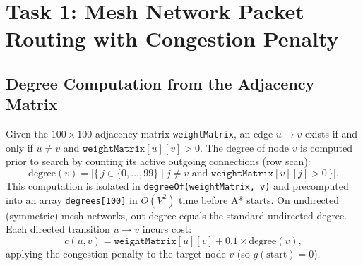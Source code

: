 \documentclass[11pt,a4paper]{article}
\begin{document}
\section{Task 1: Mesh Network Packet Routing with Congestion Penalty}

\subsection{Degree Computation from the Adjacency Matrix}
Given the $100 \times 100$ adjacency matrix \texttt{weightMatrix}, an edge $u \to v$ exists if and only if $u \neq v$ and $\texttt{weightMatrix}[u][v] > 0$. The degree of node $v$ is computed prior to search by counting its active outgoing connections (row scan):
\[
    \text{degree}(v) = \bigl|\{\, j \in \{0,\dots,99\} \mid j \neq v \text{ and } \texttt{weightMatrix}[v][j] > 0 \,\}\bigr|.
\]
This computation is isolated in \texttt{degreeOf(weightMatrix, v)} and precomputed into an array \texttt{degrees[100]} in $O(V^2)$ time before A* starts. On undirected (symmetric) mesh networks, out-degree equals the standard undirected degree. Each directed transition $u \to v$ incurs cost:
\[
    c(u, v) = \texttt{weightMatrix}[u][v] + 0.1 \times \text{degree}(v),
\]
applying the congestion penalty to the target node $v$ (so $g(\text{start}) = 0$).
\end{document}
